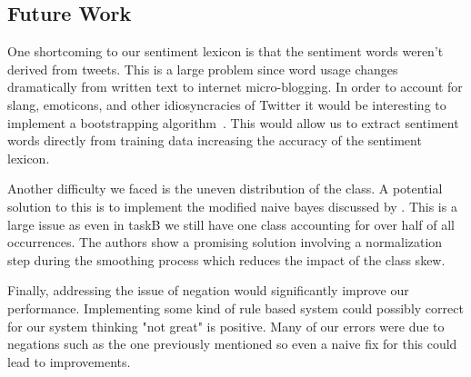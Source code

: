 \documentclass[11pt]{article}
\begin{document}
\subsection{Future Work}
One shortcoming to our sentiment lexicon is that the sentiment words weren't derived from tweets. This is a large problem since word usage changes dramatically from written text to internet micro-blogging. In order to account for slang, emoticons, and other idiosyncracies of Twitter it would be interesting to implement a bootstrapping algorithm~\cite{Riloffbootstrapping}. This would allow us to extract sentiment words directly from training data increasing the accuracy of the sentiment lexicon.

Another difficulty we faced is the uneven distribution of the class. A potential solution to this is to implement the modified naive bayes discussed by \cite{FranknaiveBayes}. This is a large issue as even in taskB we still have one class accounting for over half of all occurrences. The authors show a promising solution involving a normalization step during the smoothing process which reduces the impact of the class skew.

Finally, addressing the issue of negation would significantly improve our performance. Implementing some kind of rule based system could possibly correct for our system thinking "not great" is positive. Many of our errors were due to negations such as the one previously mentioned so even a naive fix for this could lead to improvements.



\end{document}
